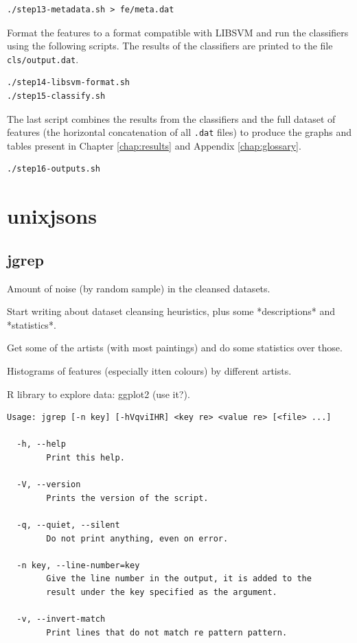 \documentclass[11pt,a4paper,draft]{report}
\begin{document}
\begin{Verbatim}[frame=leftline]
./step13-metadata.sh > fe/meta.dat
\end{Verbatim}

Format the features to a format compatible with LIBSVM and run the classifiers
using the following scripts.  The results of the classifiers are printed to the
file \texttt{cls/output.dat}.

\begin{Verbatim}[frame=leftline]
./step14-libsvm-format.sh
./step15-classify.sh
\end{Verbatim}

The last script combines the results from the classifiers and the full dataset
of features (the horizontal concatenation of all \texttt{.dat} files) to
produce the graphs and tables present in Chapter \ref{chap:results} and
Appendix \ref{chap:glossary}.

\begin{Verbatim}[frame=leftline]
./step16-outputs.sh
\end{Verbatim}

\chapter{unixjsons}
\label{chap:unixjsons}

\section{jgrep}

Amount of noise (by random sample) in the cleansed datasets.

Start writing about dataset cleansing heuristics, plus some *descriptions* and
*statistics*.

Get some of the artists (with most paintings) and do some statistics over
those.

Histograms of features (especially itten colours) by different artists.

R library to explore data: ggplot2 (use it?).

{\small
\begin{Verbatim}[samepage=true]
Usage: jgrep [-n key] [-hVqviIHR] <key re> <value re> [<file> ...]

  -h, --help
        Print this help.

  -V, --version
        Prints the version of the script.

  -q, --quiet, --silent
        Do not print anything, even on error.

  -n key, --line-number=key
        Give the line number in the output, it is added to the
        result under the key specified as the argument.

  -v, --invert-match
        Print lines that do not match re pattern pattern.
\end{Verbatim}
}
\end{document}
